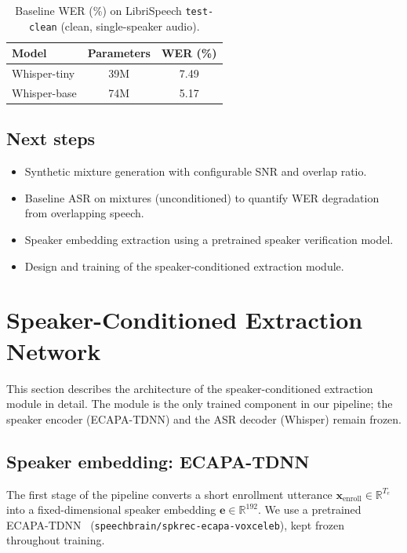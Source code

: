 \documentclass{article}
\begin{document}
\begin{table}[H]
  \caption{Baseline WER (\%) on LibriSpeech \texttt{test-clean} (clean, single-speaker audio).}
  \label{tab:baseline-wer}
  \centering
  \begin{tabular}{lcc}
    \toprule
    Model & Parameters & WER (\%) \\
    \midrule
    Whisper-tiny  & 39M  & 7.49 \\
    Whisper-base  & 74M  & 5.17 \\
    \bottomrule
  \end{tabular}
\end{table}

\subsection{Next steps}
\begin{itemize}
    \item Synthetic mixture generation with configurable SNR and overlap ratio.
    \item Baseline ASR on mixtures (unconditioned) to quantify WER degradation from overlapping speech.
    \item Speaker embedding extraction using a pretrained speaker verification model.
    \item Design and training of the speaker-conditioned extraction module.
\end{itemize}


\section{Speaker-Conditioned Extraction Network}

This section describes the architecture of the speaker-conditioned extraction module in detail.
The module is the only trained component in our pipeline; the speaker encoder (ECAPA-TDNN) and the ASR decoder (Whisper) remain frozen.

\subsection{Speaker embedding: ECAPA-TDNN}

The first stage of the pipeline converts a short enrollment utterance $\mathbf{x}_{\text{enroll}} \in \mathbb{R}^{T_e}$ into a fixed-dimensional speaker embedding $\mathbf{e} \in \mathbb{R}^{192}$. We use a pretrained ECAPA-TDNN~\citep{ECAPA} (\texttt{speechbrain/spkrec-ecapa-voxceleb}), kept frozen throughout training.
\end{document}
